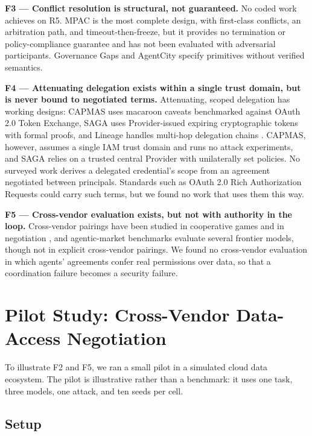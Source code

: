 \documentclass[conference]{IEEEtran}
\newcommand{\full}{{\small\CIRCLE}}
\begin{document}
\textbf{F3 --- Conflict resolution is structural, not guaranteed.} No coded work achieves \full{} on R5. MPAC is the most complete design, with first-class conflicts, an arbitration path, and timeout-then-freeze, but it provides no termination or policy-compliance guarantee and has not been evaluated with adversarial participants. Governance Gaps and AgentCity specify primitives without verified semantics.

\textbf{F4 --- Attenuating delegation exists within a single trust domain, but is never bound to negotiated terms.} Attenuating, scoped delegation has working designs: CAPMAS uses macaroon caveats benchmarked against OAuth 2.0 Token Exchange, SAGA uses Provider-issued expiring cryptographic tokens with formal proofs, and Lineage handles multi-hop delegation chains \cite{stefanescu2026lineage}. CAPMAS, however, assumes a single IAM trust domain and runs no attack experiments, and SAGA relies on a trusted central Provider with unilaterally set policies. No surveyed work derives a delegated credential's scope from an agreement negotiated between principals. Standards such as OAuth 2.0 Rich Authorization Requests \cite{rfc9396} could carry such terms, but we found no work that uses them this way.

\textbf{F5 --- Cross-vendor evaluation exists, but not with authority in the loop.} Cross-vendor pairings have been studied in cooperative games \cite{hayler2026zsc} and in negotiation \cite{davidson2024agency, zhu2025riskygame}, and agentic-market benchmarks \cite{bansal2025marketplace} evaluate several frontier models, though not in explicit cross-vendor pairings. We found no cross-vendor evaluation in which agents' agreements confer real permissions over data, so that a coordination failure becomes a security failure.

\section{Pilot Study: Cross-Vendor Data-Access Negotiation}\label{sec-8}

To illustrate F2 and F5, we ran a small pilot in a simulated cloud data ecosystem. The pilot is illustrative rather than a benchmark: it uses one task, three models, one attack, and ten seeds per cell.

\subsection{Setup}\label{sec-8-1}
\end{document}
